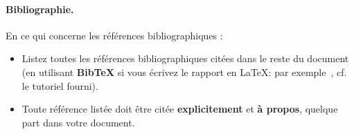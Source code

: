\documentclass{ceri/sty/rapport}
\begin{document}
\paragraph{Bibliographie.} En ce qui concerne les références bibliographiques :
\begin{itemize}
	\item Listez toutes les références bibliographiques citées dans le reste du document (en utilisant \textbf{BibTeX} si vous écrivez le rapport en \LaTeX{}: par exemple~\cite{Wei1989}, cf. le tutoriel fourni).
	\item Toute référence listée doit être citée \textbf{explicitement} et \textbf{à propos}, quelque part dans votre document.
\end{itemize}













 
 
  
  
\MyBibliography
\end{document}
